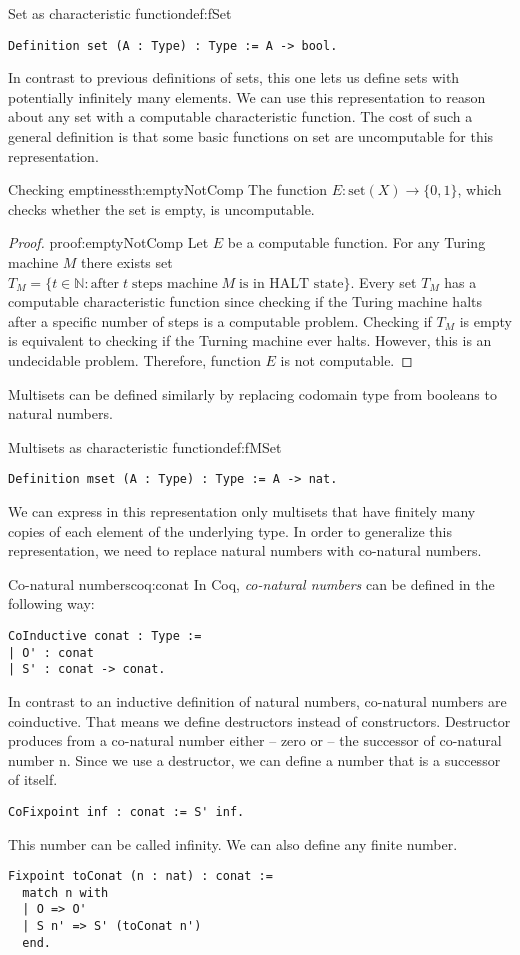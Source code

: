 \begin{defi}{Set as characteristic function}{def:fSet}
\begin{verbatim}
Definition set (A : Type) : Type := A -> bool.
\end{verbatim}
\end{defi}
In contrast to previous definitions of sets, this one lets us define sets with potentially infinitely many elements. We can use this representation to reason about any set with a computable characteristic function. The cost of such a general definition is that some basic functions on set are uncomputable for this representation.
\begin{theo}{Checking emptiness}{th:emptyNotComp}
The function $E : \textrm{set}(X) \rightarrow \{0, 1\}$, which checks whether the set is empty, is uncomputable.
\end{theo}
\begin{proof}{}{proof:emptyNotComp}
Let $E$ be a computable function. For any Turing machine $M$ there exists set $T_M = \{t \in \mathbb{N} : \textrm{after} \; t \; \textrm{steps machine} \; M \; \textrm{is in HALT state}\}$. Every set $T_M$ has a computable characteristic function since checking if the Turing machine halts after a specific number of steps is a computable problem. Checking if $T_M$ is empty is equivalent to checking if the Turning machine ever halts. However, this is an undecidable problem. Therefore, function $E$ is not computable. \phantom{dasd} \contradiction
\end{proof}
Multisets can be defined similarly by replacing codomain type from booleans to natural numbers.
\begin{defi}{Multisets as characteristic function}{def:fMSet}
\begin{verbatim}
Definition mset (A : Type) : Type := A -> nat.
\end{verbatim}
\end{defi}
We can express in this representation only multisets that have finitely many copies of each element of the underlying type. In order to generalize this representation, we need to replace natural numbers with co-natural numbers.
\begin{coq}{Co-natural numbers}{coq:conat}
In Coq, \emph{co-natural numbers} can be defined in the following way:
\begin{verbatim}
CoInductive conat : Type := 
| O' : conat
| S' : conat -> conat.
\end{verbatim}
In contrast to an inductive definition of natural numbers, co-natural numbers are coinductive. That means we define destructors instead of constructors. Destructor produces from a co-natural number either -- zero or  -- the successor of co-natural number n. Since we use a destructor, we can define a number that is a successor of itself.
\begin{verbatim}
CoFixpoint inf : conat := S' inf.
\end{verbatim}
This number can be called infinity. We can also define any finite number.
\begin{verbatim}
Fixpoint toConat (n : nat) : conat :=
  match n with
  | O => O'
  | S n' => S' (toConat n') 
  end.
\end{verbatim}
\end{coq}
